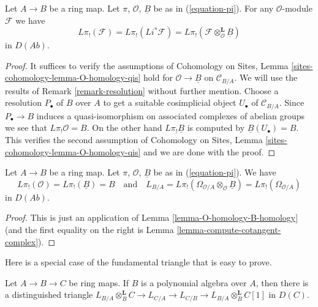\begin{lemma}
\label{lemma-O-homology-B-homology}
Let $A \to B$ be a ring map. Let $\pi$, $\mathcal{O}$, $\underline{B}$
be as in (\ref{equation-pi}). For any $\mathcal{O}$-module $\mathcal{F}$
we have
$$
L\pi_!(\mathcal{F}) = L\pi_!(Li^*\mathcal{F}) =
L\pi_!(\mathcal{F} \otimes_\mathcal{O}^\mathbf{L} \underline{B})
$$
in $D(\textit{Ab})$.
\end{lemma}

\begin{proof}
It suffices to verify the assumptions of Cohomology on Sites, Lemma
\ref{sites-cohomology-lemma-O-homology-qis}
hold for $\mathcal{O} \to \underline{B}$ on $\mathcal{C}_{B/A}$.
We will use the results of Remark \ref{remark-resolution} without
further mention. Choose a resolution $P_\bullet$ of $B$ over $A$ to get a
suitable cosimplicial object $U_\bullet$ of $\mathcal{C}_{B/A}$.
Since $P_\bullet \to B$ induces a quasi-isomorphism on associated
complexes of abelian groups we see that $L\pi_!\mathcal{O} = B$.
On the other hand $L\pi_!\underline{B}$ is computed by
$\underline{B}(U_\bullet) = B$. This verifies the second assumption of
Cohomology on Sites, Lemma
\ref{sites-cohomology-lemma-O-homology-qis}
and we are done with the proof.
\end{proof}

\begin{lemma}
\label{lemma-apply-O-B-comparison}
Let $A \to B$ be a ring map. Let $\pi$, $\mathcal{O}$, $\underline{B}$
be as in (\ref{equation-pi}). We have
$$
L\pi_!(\mathcal{O}) = L\pi_!(\underline{B}) = B
\quad\text{and}\quad
L_{B/A} = L\pi_!(\Omega_{\mathcal{O}/A} \otimes_\mathcal{O} \underline{B}) =
L\pi_!(\Omega_{\mathcal{O}/A})
$$
in $D(\textit{Ab})$.
\end{lemma}

\begin{proof}
This is just an application of Lemma \ref{lemma-O-homology-B-homology}
(and the first equality on the right is
Lemma \ref{lemma-compute-cotangent-complex}).
\end{proof}

\noindent
Here is a special case of the fundamental triangle that is easy to prove.

\begin{lemma}
\label{lemma-special-case-triangle}
Let $A \to B \to C$ be ring maps. If $B$ is a polynomial algebra over
$A$, then there is a distinguished triangle 
$L_{B/A} \otimes_B^\mathbf{L} C \to L_{C/A} \to L_{C/B} \to
L_{B/A} \otimes_B^\mathbf{L} C[1]$ in $D(C)$.
\end{lemma}

